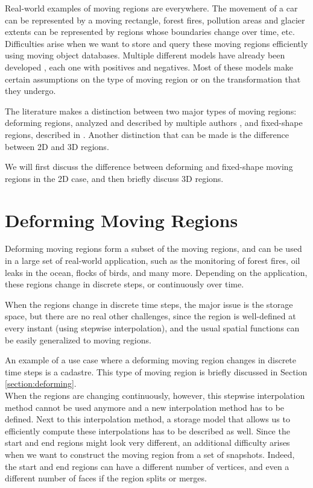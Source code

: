 \label{section:moving_regions}

Real-world examples of moving regions are everywhere. The movement of a car can be represented by a moving rectangle, forest fires, pollution areas and glacier extents can be represented by regions whose boundaries change over time, etc. Difficulties arise when we want to store and query these moving regions efficiently using moving object databases. Multiple different models have already been developed \cite{fmregion,polyhedra,model_structure_for_mod}, each one with positives and negatives. Most of these models make certain assumptions on the type of moving region or on the transformation that they undergo.

The literature makes a distinction between two major types of moving regions: deforming regions, analyzed and described by multiple authors \cite{polyhedra,model_structure_for_mod,moving_obj_foundation}, and fixed-shape regions, described in \cite{fmregion}. Another distinction that can be made is the difference between 2D and 3D regions. 

We will first discuss the difference between deforming and fixed-shape moving regions in the 2D case, and then briefly discuss 3D regions.

\section{Deforming Moving Regions}
\label{section:deforming_regions}

Deforming moving regions form a subset of the moving regions, and can be used in a large set of real-world application, such as the monitoring of forest fires, oil leaks in the ocean, flocks of birds, and many more. Depending on the application, these regions change in discrete steps, or continuously over time. 

When the regions change in discrete time steps, the major issue is the storage space, but there are no real other challenges, since the region is well-defined at every instant (using stepwise interpolation), and the usual spatial functions can be easily generalized to moving regions.

An example of a use case where a deforming moving region changes in discrete time steps is a cadastre. This type of moving region is briefly discussed in Section \ref{section:deforming}. \\

When the regions are changing continuously, however, this stepwise interpolation method cannot be used anymore and a new interpolation method has to be defined. Next to this interpolation method, a storage model that allows us to efficiently compute these interpolations has to be described as well. Since the start and end regions might look very different, an additional difficulty arises when we want to construct the moving region from a set of snapshots. Indeed, the start and end regions can have a different number of vertices, and even a different number of faces if the region splits or merges.

